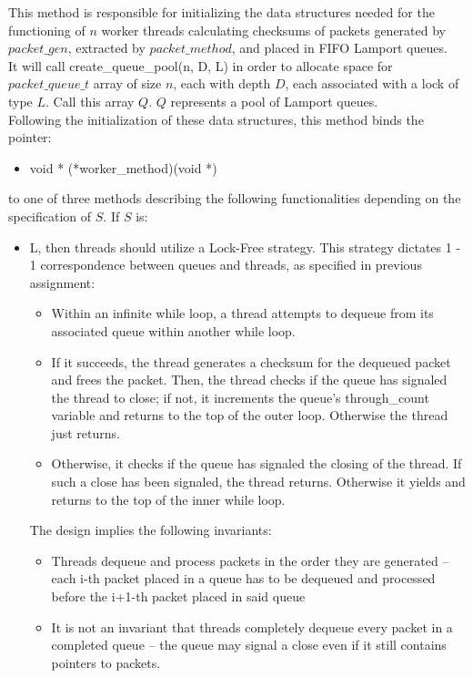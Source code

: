 \documentclass[]{article}
\begin{document}
\begin{itemize}
\begin{itemize}
\begin{itemize}
		\end{itemize}
		This method is responsible for initializing the data structures needed for the functioning of $n$ worker threads calculating checksums of packets generated by  $packet\_gen$, extracted by $packet\_method$, and placed in FIFO Lamport queues.
		\\
		It will call create\_queue\_pool(n, D, L) in order to allocate space for $packet\_queue\_t$ array of size $n$, each with depth $D$, each associated with a lock of type $L$. Call this array $Q$. $Q$ represents a pool of Lamport queues.
		\\
		Following the initialization of these data structures, this method binds the pointer:
		\begin{itemize}
			\item void * (*worker\_method)(void *)
		\end{itemize} 
		to one of three methods describing the following functionalities depending on the specification of $S$. If $S$ is:
		\begin{itemize}
			\item L, then threads should utilize a Lock-Free strategy. This strategy dictates 1 - 1 correspondence between queues and threads, as specified in previous assignment: 
			\begin{itemize}
				\item Within an infinite while loop, a thread attempts to dequeue from its associated queue within another while loop. 
				\item If it succeeds, the thread generates a checksum for the dequeued packet and frees the packet. Then, the thread checks if the queue has signaled the thread to close; if not, it increments the queue's through\_count variable and returns to the top of the outer loop. Otherwise the thread just returns.
				\item Otherwise, it checks if the queue has signaled the closing of the thread. If such a close has been signaled, the thread returns. Otherwise it yields and returns to the top of the inner while loop.
			\end{itemize}
			The design implies the following invariants:
			\begin{itemize}
				\item Threads dequeue and process packets in the order they are generated -- each i-th packet placed in a queue has to be dequeued and processed before the i+1-th packet placed in said queue
				\item It is not an invariant that threads completely dequeue every packet in a completed queue -- the queue may signal a close even if it still contains pointers to packets.

\end{itemize}
\end{itemize}
\end{itemize}
\end{itemize}
\end{document}
